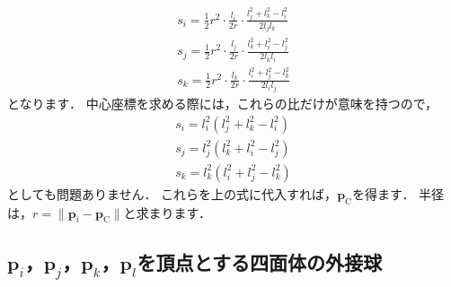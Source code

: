 ﻿\documentclass[a4paper]{jsarticle}
\begin{document}
\begin{align*}
s_{i}=\frac{1}{2}r^{2}\cdot\frac{l_{i}}{2r}\cdot\frac{l_{j}^{2}+l_{k}^{2}-l_{i}^{2}}{2l_{j}l_{k}}
\\
s_{j}=\frac{1}{2}r^{2}\cdot\frac{l_{j}}{2r}\cdot\frac{l_{k}^{2}+l_{i}^{2}-l_{j}^{2}}{2l_{k}l_{i}}
\\
s_{k}=\frac{1}{2}r^{2}\cdot\frac{l_{k}}{2r}\cdot\frac{l_{i}^{2}+l_{j}^{2}-l_{k}^{2}}{2l_{i}l_{j}}
\end{align*}
となります．
中心座標を求める際には，これらの比だけが意味を持つので，
\begin{align*}
s_{i}=l_{i}^{2}(l_{j}^{2}+l_{k}^{2}-l_{i}^{2})
\\
s_{j}=l_{j}^{2}(l_{k}^{2}+l_{i}^{2}-l_{j}^{2})
\\
s_{k}=l_{k}^{2}(l_{i}^{2}+l_{j}^{2}-l_{k}^{2})
\end{align*}
としても問題ありません．
これらを上の式に代入すれば，$\boldsymbol{p}_{\mathrm{C}}$を得ます．
半径は，$r=\|\boldsymbol{p}_{i}-\boldsymbol{p}_{\mathrm{C}}\|$と求まります．

\subsection{$\boldsymbol{p}_{i}$，$\boldsymbol{p}_{j}$，$\boldsymbol{p}_{k}$，$\boldsymbol{p}_{l}$を頂点とする四面体の外接球}
\end{document}
